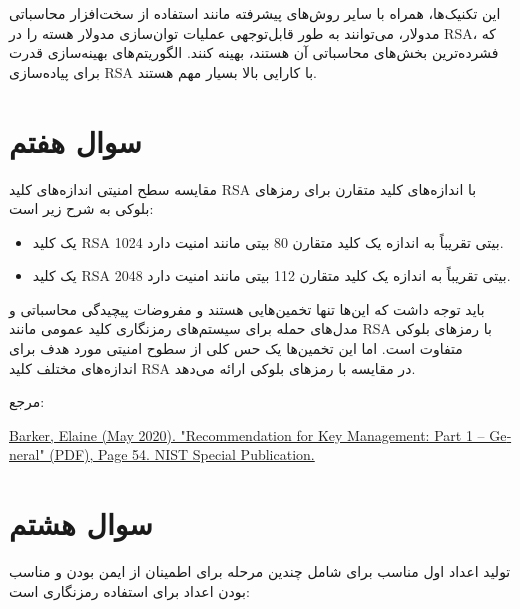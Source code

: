 \documentclass{report}
\begin{document}
این تکنیک‌ها، همراه با سایر روش‌های پیشرفته مانند استفاده از سخت‌افزار محاسباتی مدولار، می‌توانند به طور قابل‌توجهی عملیات توان‌سازی مدولار هسته را در RSA، که فشرده‌ترین بخش‌های محاسباتی آن هستند، بهینه کنند. الگوریتم‌های بهینه‌سازی قدرت برای پیاده‌سازی RSA با کارایی بالا بسیار مهم هستند.

\section{سوال هفتم}

مقایسه سطح امنیتی اندازه‌های کلید RSA با اندازه‌های کلید متقارن برای رمزهای بلوکی به شرح زیر است:
\begin{itemize}
    \item 
    یک کلید RSA 1024 بیتی تقریباً به اندازه یک کلید متقارن 80 بیتی مانند  امنیت دارد.
    \item
    یک کلید RSA 2048 بیتی تقریباً به اندازه یک کلید متقارن 112 بیتی مانند  امنیت دارد.
\end{itemize}

باید توجه داشت که این‌ها تنها تخمین‌هایی هستند و مفروضات پیچیدگی محاسباتی و مدل‌های حمله برای سیستم‌های رمزنگاری کلید عمومی مانند RSA با رمزهای بلوکی متفاوت است. اما این تخمین‌ها یک حس کلی از سطوح امنیتی مورد هدف برای اندازه‌های مختلف کلید RSA در مقایسه با رمزهای بلوکی ارائه می‌دهد.

مرجع:
\begin{latin}
\href{https://nvlpubs.nist.gov/nistpubs/SpecialPublications/NIST.SP.800-57pt1r5.pdf}{Barker, Elaine (May 2020). "Recommendation for Key Management: Part 1 – General" (PDF), Page 54. NIST Special Publication.} 
\end{latin}

\section{سوال هشتم}

تولید اعداد اول مناسب برای  شامل چندین مرحله برای اطمینان از ایمن بودن و مناسب بودن اعداد برای استفاده رمزنگاری است:
\end{document}
